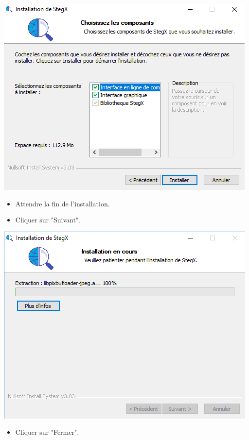 \documentclass[11pt]{article}
\begin{document}
\hspace{1cm}
\includegraphics[scale=1]{pictures/choix.png}
\vspace{1cm}

\begin{itemize}
\item Attendre la fin de l'installation.
\item Cliquer sur "Suivant". 
\end{itemize}

\hspace{1cm}
\includegraphics[scale=1]{pictures/installation.png}
\vspace{1cm}

\begin{itemize}
\item Cliquer sur "Fermer". 
\end{itemize}
\end{document}
